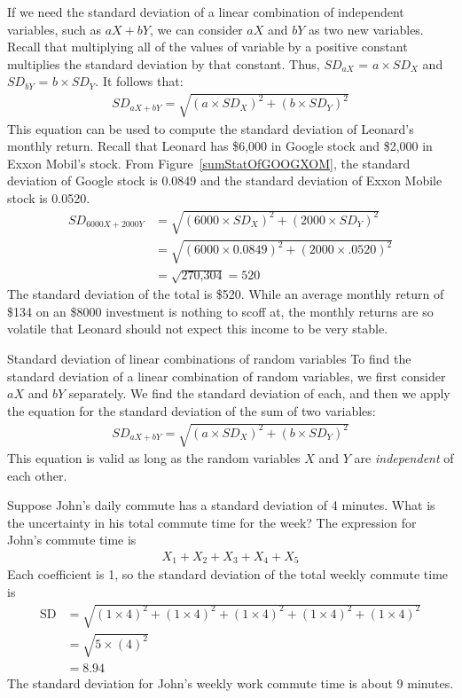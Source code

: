 If we need the standard deviation of a linear combination of independent variables, such as $aX + bY$, we can consider $aX$ and $bY$ as two new variables. Recall that multiplying all of the values of variable by a positive constant multiplies the standard deviation by that constant. Thus, $SD_{aX}$ =  $a \times SD_X$ and $SD_{bY}$ =  $b \times SD_Y$. It follows that:
\begin{align*}
SD_{aX + bY} = \sqrt{(a \times SD_X)^2 + (b \times SD_Y)^2}
\end{align*}
This equation can be used to compute the standard deviation of Leonard's monthly return. Recall that Leonard has \$6,000 in Google stock and \$2,000 in Exxon Mobil's stock. From Figure~\ref{sumStatOfGOOGXOM}, the standard deviation of Google stock is 0.0849 and the standard deviation of Exxon Mobile stock is 0.0520.
\begin{align*}
SD_{6000X + 2000Y}
	&= \sqrt{(6000\times SD_X)^2 + (2000\times SD_Y)^2} \\
	&= \sqrt{(6000\times 0.0849)^2 + (2000\times .0520)^2} \\
	&= \sqrt{\text{270,304}} = 520
\end{align*}
The standard deviation of the total is \$520. While an average monthly return of \$134 on an \$8000 investment is nothing to scoff at, the monthly returns are so volatile that Leonard should not expect this income to be very stable.

\D{\newpage}

\begin{onebox}{Standard deviation of linear combinations of random variables}
To find the standard deviation of a linear combination of random variables, we first consider $aX$ and $bY$ separately. We find the standard deviation of each, and then we apply the equation for the standard deviation of the sum of two variables:
\begin{align*}
SD_{aX + bY} = \sqrt{(a\times SD_X)^2 + (b\times SD_Y)^2}
\end{align*}
This equation is valid as long as the random variables $X$ and $Y$ are \emph{independent} of each other.\end{onebox}

\begin{examplewrap}
\begin{nexample}{Suppose John's daily commute has a standard deviation of 4 minutes. What is the uncertainty in his total commute time for the week?} \label{sdOfJohnsCommuteWeeklyTime}
The expression for John's commute time is
\begin{align*}
X_1 + X_2 + X_3 + X_4 + X_5
\end{align*}
Each coefficient is 1, so the standard deviation of the total weekly commute time is
\begin{align*}
\text{SD}&= \sqrt{(1 \times 4)^2 + (1 \times 4)^2 + (1 \times 4)^2 + (1 \times 4)^2 + (1 \times 4)^2} \\
&= \sqrt{5\times (4)^2} \\
&= 8.94
\end{align*}
The standard deviation for John's weekly work commute time is about 9 minutes.
\end{nexample}
\end{examplewrap}

